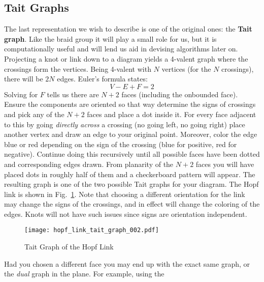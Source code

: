     \subsection{Tait Graphs}
        The last representation we wish to describe is one of the original
        ones: the \textbf{Tait graph}. Like the braid group it will play a
        small role for us, but it is computationally useful and will lend
        us aid in devising algorithms later on. Projecting a knot or link down
        to a diagram yields a 4-valent graph where the crossings form the
        vertices. Being 4-valent with $N$ vertices (for the $N$ crossings),
        there will be $2N$ edges. Euler's formula states:
        \begin{equation}
            V-E+F=2
        \end{equation}
        Solving for $F$ tells us there are $N+2$ faces (including the onbounded
        face). Ensure the components are oriented so that way determine the
        signs of crossings and pick any of the $N+2$ faces and place a dot
        inside it.
        For every face adjacent to this by going \textit{directly across} a
        crossing (no going left, no going right) place another vertex and
        draw an edge to your original point. Moreover, color the edge blue or
        red depending on the sign of the crossing (blue for positive, red for
        negative). Continue doing this recursively until all possible faces
        have been dotted and corresponding edges drawn. From planarity of the
        $N+2$ faces you will have placed dots in roughly half of them and a
        checkerboard pattern will appear. The resulting graph is one of the
        two possible Tait graphs for your diagram. The Hopf link is shown in
        Fig.~\ref{fig:hopf_link_tait_graph_002}. Note that choosing a different
        orientation for the link may change the signs of the crossings, and in
        effect will change the coloring of the edges. Knots will not have such
        issues since signs are orientation independent.
        \begin{figure}
            \centering
            \texttt{[image: hopf\_link\_tait\_graph\_002.pdf]}
            \caption{Tait Graph of the Hopf Link}
            \label{fig:hopf_link_tait_graph_002}
        \end{figure}
        \par\hfill\par
        Had you chosen a different face you may end up with the exact same
        graph, or the \textit{dual} graph in the plane. For example, using the

